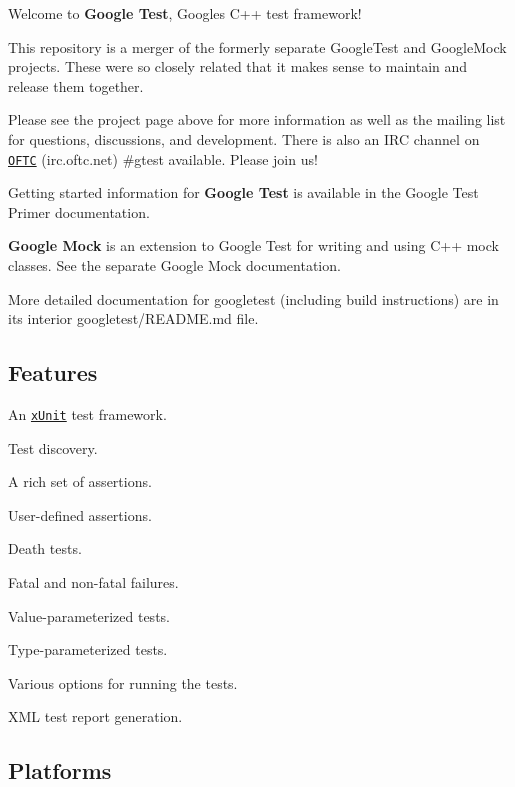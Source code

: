 \href{https://travis-ci.org/google/googletest}{\tt } \href{https://ci.appveyor.com/project/GoogleTestAppVeyor/googletest/branch/master}{\tt }

Welcome to {\bfseries Google Test}, Google\textquotesingle{}s C++ test framework!

This repository is a merger of the formerly separate Google\+Test and Google\+Mock projects. These were so closely related that it makes sense to maintain and release them together.

Please see the project page above for more information as well as the mailing list for questions, discussions, and development. There is also an I\+RC channel on \href{https://webchat.oftc.net/}{\tt O\+F\+TC} (irc.\+oftc.\+net) \#gtest available. Please join us!

Getting started information for {\bfseries Google Test} is available in the Google Test Primer documentation.

{\bfseries Google Mock} is an extension to Google Test for writing and using C++ mock classes. See the separate Google Mock documentation.

More detailed documentation for googletest (including build instructions) are in its interior googletest/\+R\+E\+A\+D\+ME.md file.

\subsection*{Features}


\begin{DoxyItemize}
\item An \href{https://en.wikipedia.org/wiki/XUnit}{\tt x\+Unit} test framework.
\item Test discovery.
\item A rich set of assertions.
\item User-\/defined assertions.
\item Death tests.
\item Fatal and non-\/fatal failures.
\item Value-\/parameterized tests.
\item Type-\/parameterized tests.
\item Various options for running the tests.
\item X\+ML test report generation.
\end{DoxyItemize}

\subsection*{Platforms}

